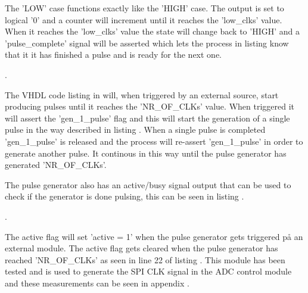 The 'LOW' case functions exactly like the 'HIGH' case. The output is set to logical '0' and a counter will increment until it reaches the 'low\_clks' value. When it reaches the 'low\_clks' value the state will change back to 'HIGH' and a 'pulse\_complete' signal will be asserted which lets the process in listing  know that it it has finished a pulse and is ready for the next one.

. 

The VHDL code listing in  will, when triggered by an external source, start producing pulses until it reaches the 'NR\_OF\_CLKs' value. When triggered it will assert the 'gen\_1\_pulse' flag and this will start the generation of a single pulse in the way described in listing . When a single pulse is completed 'gen\_1\_pulse' is released and the process will re-assert 'gen\_1\_pulse' in order to generate another pulse. It continous in this way until the pulse generator has generated 'NR\_OF\_CLKs'.

The pulse generator also has an active/busy signal output that can be used to check if the generator is done pulsing, this can be seen in listing .

. 

The active flag will set 'active = 1' when the pulse generator gets triggered på an external module. The active flag gets cleared when the pulse generator has reached 'NR\_OF\_CLKs' as seen in line 22 of listing . This module has been tested and is used to generate the SPI CLK signal in the ADC control module and these measurements can be seen in appendix .





